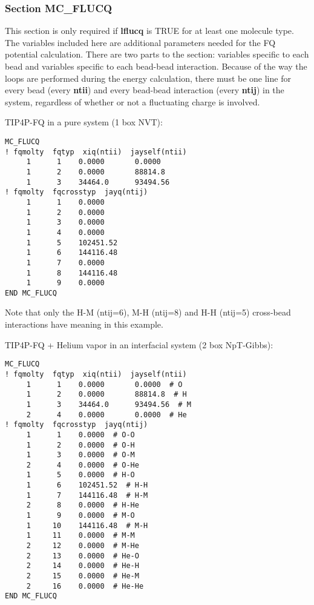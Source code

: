 \documentclass[12pt,letterpaper]{article}
\begin{document}
\subsubsection{Section \textbf{MC\_FLUCQ}}

This section is only required if {\bf lflucq} is TRUE for at least one molecule type.
The variables included here are additional parameters needed for the
FQ potential calculation. There are two parts to the section: variables specific 
to each bead and variables specific to each bead-bead interaction.
Because of the way the loops are performed during the energy calculation, there 
must be one line for every bead (every {\bf ntii}) and every bead-bead interaction 
(every {\bf ntij}) in the system, regardless of whether or not a fluctuating charge
is involved.

\hfill\break
TIP4P-FQ in a pure system (1 box NVT):

\begin{verbatim}
MC_FLUCQ
! fqmolty  fqtyp  xiq(ntii)  jayself(ntii)
     1      1    0.0000       0.0000
     1      2    0.0000       88814.8
     1      3    34464.0      93494.56
! fqmolty  fqcrosstyp  jayq(ntij)
     1      1    0.0000
     1      2    0.0000
     1      3    0.0000
     1      4    0.0000
     1      5    102451.52
     1      6    144116.48
     1      7    0.0000
     1      8    144116.48
     1      9    0.0000
END MC_FLUCQ
\end{verbatim}

\noindent Note that only the H-M (ntij=6), M-H (ntij=8) and H-H (ntij=5) cross-bead 
interactions have meaning in this example.

\hfill\break
TIP4P-FQ + Helium vapor in an interfacial system (2 box NpT-Gibbs):

\begin{verbatim}
MC_FLUCQ
! fqmolty  fqtyp  xiq(ntii)  jayself(ntii)
     1      1    0.0000       0.0000  # O
     1      2    0.0000       88814.8  # H 
     1      3    34464.0      93494.56  # M
     2      4    0.0000       0.0000  # He
! fqmolty  fqcrosstyp  jayq(ntij)
     1      1    0.0000  # O-O
     1      2    0.0000  # O-H
     1      3    0.0000  # O-M
     2      4    0.0000  # O-He
     1      5    0.0000  # H-O
     1      6    102451.52  # H-H
     1      7    144116.48  # H-M
     2      8    0.0000  # H-He
     1      9    0.0000  # M-O
     1     10    144116.48  # M-H
     1     11    0.0000  # M-M
     2     12    0.0000  # M-He
     2     13    0.0000  # He-O
     2     14    0.0000  # He-H
     2     15    0.0000  # He-M
     2     16    0.0000  # He-He
END MC_FLUCQ
\end{verbatim}
\end{document}
